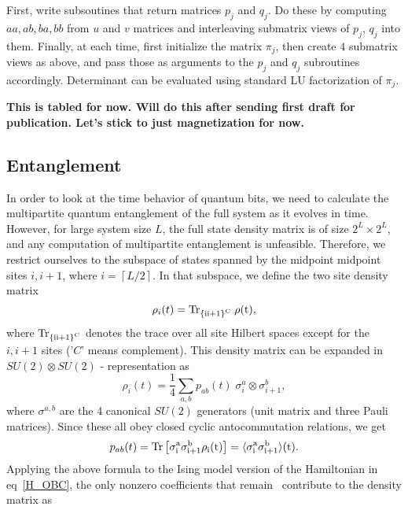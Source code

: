 \documentclass[a4paper,10pt]{article}
\begin{document}
First, write subsoutines that return matrices $p_j$ and $q_j$. Do these by computing $aa,ab,ba,bb$ from $u$ and $v$ matrices and interleaving submatrix views of $p_j$, $q_j$ into them. Finally, at each time, first initialize the matrix $\pi_j$, then create $4$ submatrix views as above, and pass those as arguments to the $p_j$ and $q_j$ subroutines accordingly. Determinant can be evaluated using standard LU factorization of $\pi_j$.

\textbf{This is tabled for now. Will do this after sending first draft for publication. Let's stick to just magnetization for now.}
\subsection{Entanglement}
\label{subsec:entanglement}
In order to look at the time behavior of quantum bits, we need to calculate the multipartite quantum entanglement of the full system as it evolves in time. However, for large system size $L$, the full state density matrix is of size $2^L\times2^L$, and any computation of multipartite entanglement is unfeasible. Therefore, we restrict ourselves to the subspace of states spanned by the midpoint midpoint sites $i,i+1$, where $i = \left \lceil{L/2}\right \rceil $. In that subspace, we define the two site density matrix
\begin{equation}
\label{eq:tsitedmat}
\rho_i(t) = \rm{Tr}_{\left\{ii+1\right\}^C}\;\rho(t),
\end{equation}
where $\rm{Tr}_{\left\{ii+1\right\}^C}$ denotes the trace over all site Hilbert spaces except for the $i,i+1$ sites ('$C$' means complement). This density matrix can be expanded in $SU(2)\otimes SU(2)$ - representation as
\begin{equation}
\rho_i(t) = \frac{1}{4}\sum_{a,b} p_{ab}(t)\;\sigma^a_i \otimes  \sigma^b_{i+1},
\end{equation}
where $\sigma^{a,b}$ are the 4 canonical $SU(2)$ generators (unit matrix and three Pauli matrices). Since these all obey closed cyclic antocommutation relations, we get
\begin{equation}
 p_{ab}(t) = \rm{Tr}\left[\sigma^a_i\sigma^b_{i+1}\rho_i(t)\right] = \langle \sigma^a_i\sigma^b_{i+1}\rangle(t).                                                                                                                                                                       
\end{equation}
Applying the above formula to the Ising model version of the Hamiltonian in eq~\ref{H_OBC}, the only nonzero coefficients that remain~\cite{hatano,osborne} contribute to the density matrix as
\end{document}
